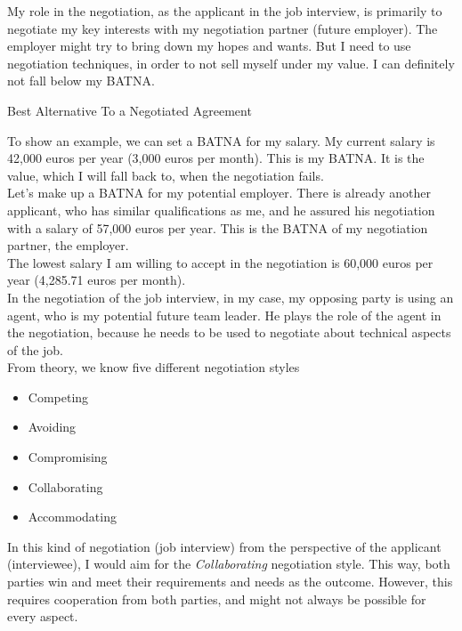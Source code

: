 \noindent My role in the negotiation, as the applicant in the job interview,
is primarily to negotiate my key interests with my negotiation partner
(future employer). The employer might try to bring down my hopes and wants.
But I need to use negotiation techniques, in order to not sell myself under
my value. I can definitely not fall below my BATNA. 

\begin{center}
	\noindent Best Alternative To a Negotiated Agreement
\end{center}


\noindent To show an example, we can set a BATNA for my salary. 
My current salary is 42,000 euros per year (3,000 euros per month).
This is my BATNA. It is the value, which I will fall back to,
when the negotiation fails. \\


\noindent Let's make up a BATNA for my potential employer. 
There is already another applicant, who has similar qualifications as me,
and he assured his negotiation with a salary of 57,000 euros per year.
This is the BATNA of my negotiation partner, the employer. \\

\noindent The lowest salary I am willing to 
accept in the negotiation is 60,000 euros per year (4,285.71 euros per month). \\

\noindent In the negotiation of the job interview, in my case,
my opposing party is using an agent, who is my potential future 
team leader. He plays the role of the agent in the negotiation,
because he needs to be used to negotiate about technical aspects
of the job. \\



\noindent From theory, we know five different negotiation styles

\begin{itemize}
	\item Competing
	\item Avoiding
	\item Compromising
	\item Collaborating
	\item Accommodating
\end{itemize}

\noindent In this kind of negotiation (job interview) from the perspective 
of the applicant (interviewee), I would aim for the \emph{Collaborating} 
negotiation style. This way, both parties win and meet their requirements and
needs as the outcome. However, this requires cooperation from both parties,
and might not always be possible for every aspect. \\

